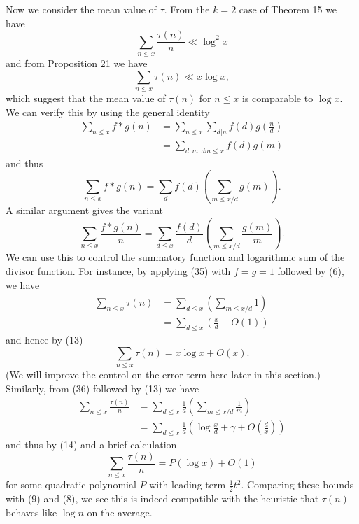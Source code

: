 \documentclass[10pt,reqno]{amsart}
\begin{document}
Now we consider the mean value of $\tau$. From the $k=2$ case of Theorem 15 we have
%
\[  \sum_{n \leq x} \frac{\tau(n)}{n} \ll \log^2 x\]
%
and from Proposition 21 we have
%
\[  \sum_{n \leq x} \tau(n) \ll x \log x,\]
%
which suggest that the mean value of $\tau(n)$ for $n \leq x$ is comparable to $\log x$. We can verify this by using the general identity
%
\begin{align*}
    \sum_{n \leq x} f*g(n) &= \sum_{n \leq x} \sum_{d|n} f(d) g(\frac{n}{d})\\
    &= \sum_{d,m: dm \leq x} f(d) g(m)
\end{align*}
%
and thus
%
\begin{equation}   \sum_{n \leq x} f*g(n) = \sum_d f(d) \left(\sum_{m \leq x/d} g(m) \right). \end{equation}
%
A similar argument gives the variant
%
\begin{equation}   \sum_{n \leq x} \frac{f*g(n)}{n} = \sum_{d \leq x} \frac{f(d)}{d}  \left(\sum_{m \leq x/d} \frac{g(m)}{m} \right). \end{equation}
%
We can use this to control the summatory function and logarithmic sum of the divisor function. For instance, by applying (35) with $f=g=1$ followed by (6), we have
%
\begin{align*}
    \sum_{n \leq x} \tau(n) &= \sum_{d \leq x} ( \sum_{m \leq x/d} 1 )\\
    &= \sum_{d \leq x} (\frac{x}{d} + O( 1 ))
\end{align*}
%
and hence by (13)
%
\begin{equation}   \sum_{n \leq x} \tau(n) = x \log x + O(x). \end{equation}
%
(We will improve the control on the error term here later in this section.) Similarly, from (36) followed by (13) we have
%
\begin{align*}
    \sum_{n \leq x} \frac{\tau(n)}{n} &= \sum_{d \leq x} \frac{1}{d} (\sum_{m \leq x/d} \frac{1}{m})\\
    &= \sum_{d \leq x} \frac{1}{d} \left( \log\frac{x}{d} + \gamma + O\left( \frac{d}{x} \right) \right)
\end{align*}
%
and thus by (14) and a brief calculation
%
\begin{equation}   \sum_{n \leq x} \frac{\tau(n)}{n} = P( \log x ) + O(1) \end{equation}
%
for some quadratic polynomial $P$ with leading term $\frac{1}{2} t^2$. Comparing these bounds with (9) and (8), we see this is indeed compatible with the heuristic that $\tau(n)$ behaves like $\log n$ on the average.
\end{document}
